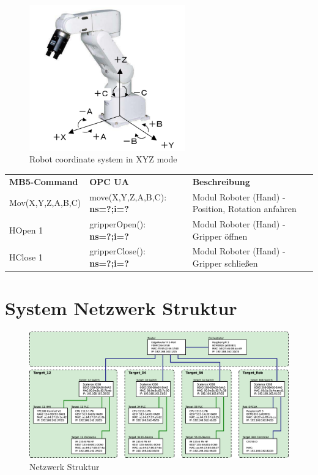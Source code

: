 \documentclass[11pt,a4paper,ngerman]{article}
\begin{document}
\begin{figure}[htp]
	\centering
	\includegraphics[width=0.6\textwidth]{images/robot_axis.png}
	\caption{Robot coordinate system in XYZ mode}
	\label{fig:robot_axis}
\end{figure}

\begin{center}
	\setlength\extrarowheight{4pt}
	\small
	
	\begin{tabularx}{\textwidth}{|p{3cm}|p{4cm}|X|}
		\hline
		\rowcolor{tublau}
		\multicolumn{3}{|c|}{\bf \color{white} \large Gripper}\\
		\hline\hline
		\rowcolor{gray!80}
		\bf MB5-Command & \bf OPC UA & \bf Beschreibung\\
		\hline\hline
		Mov(X,Y,Z,A,B,C) & move(X,Y,Z,A,B,C): \textbf{ns=?;i=?} & Modul Roboter (Hand) - Position, Rotation anfahren\\
		HOpen 1 & gripperOpen(): \textbf{ns=?;i=?} & Modul Roboter (Hand) - Gripper öffnen\\
		HClose 1 & gripperClose(): \textbf{ns=?;i=?} & Modul Roboter (Hand) - Gripper schließen\\
		\hline
	\end{tabularx}
\end{center}



\section{System Netzwerk Struktur}
\begin{figure}[!htb]
	\centering
	\includegraphics[width=.99\linewidth]{images/Network_Structure}
	\caption{Netzwerk Struktur}
	\label{fig_network_structure}
\end{figure}




\newpage
%
%

\makelast
\end{document}
